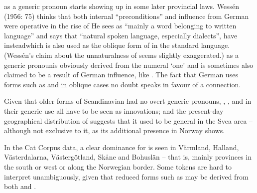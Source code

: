 \z 
\z

 as a generic pronoun starts showing up in some later provincial laws. Wessén (1956: 75) thinks that both internal “preconditions” and influence from German were operative in the rise of He sees  as “mainly a word belonging to written language” and says that “natural spoken language, especially dialects”, have instead\textstyleLinguisticExample{, }which is also used as the oblique form of  in the standard language. (Wessén’s claim about the unnaturalness of  seems slightly exaggerated.) as a generic pronoun\textstyleLinguisticExample{ }is obviously derived from the numeral ‘one’ and is sometimes also claimed to be a result of German influence, like . The fact that German uses forms such as  and  in oblique cases no doubt speaks in favour of a connection.


Given that older forms of Scandinavian had no overt generic pronouns, , , and  in their generic use all have to be seen as innovations; and the present-day geographical distribution of  suggests that it used to be general in the Svea area – although not exclusive to it, as its additional presence in Norway shows. 


In the Cat Corpus data, a clear dominance for is seen in Värmland, Halland, Västerdalarna, Västergötland, Skåne and Bohuslän – that is, mainly provinces in the south or west or along the Norwegian border. Some tokens are hard to interpret unambiguously, given that reduced forms such as  may be derived from both  and . 

